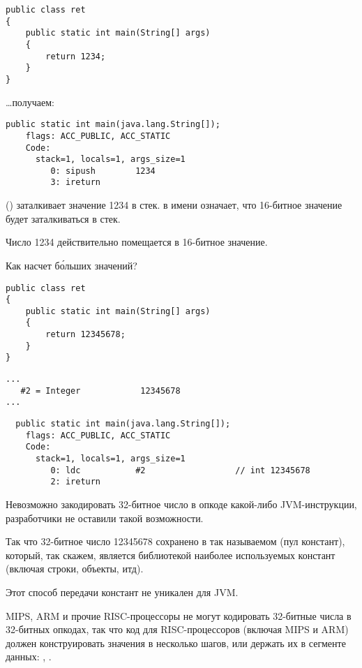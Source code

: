 \begin{lstlisting}
public class ret
{
	public static int main(String[] args)
	{
		return 1234;
	}
}
\end{lstlisting}

\dots получаем:

\begin{lstlisting}[caption=JDK 1.7 (excerpt)]
  public static int main(java.lang.String[]);
    flags: ACC_PUBLIC, ACC_STATIC
    Code:
      stack=1, locals=1, args_size=1
         0: sipush        1234
         3: ireturn       
\end{lstlisting}

 () заталкивает значение 1234 в стек.
 в имени означает, что 16-битное значение будет заталкиваться в стек. 

Число 1234 действительно помещается в 16-битное значение.

Как насчет б\'{о}льших значений?

\begin{lstlisting}
public class ret
{
	public static int main(String[] args) 
	{
		return 12345678;
	}
}
\end{lstlisting}

\begin{lstlisting}[caption=Constant pool]
...
   #2 = Integer            12345678
...
\end{lstlisting}

\begin{lstlisting}
  public static int main(java.lang.String[]);
    flags: ACC_PUBLIC, ACC_STATIC
    Code:
      stack=1, locals=1, args_size=1
         0: ldc           #2                  // int 12345678
         2: ireturn       
\end{lstlisting}

Невозможно закодировать 32-битное число в опкоде какой-либо JVM-инструкции, 
разработчики не оставили такой возможности.

Так что 32-битное число 12345678 сохранено в так называемом  (пул констант),
который, так скажем, является библиотекой наиболее используемых констант (включая строки, объекты,
итд).

Этот способ передачи констант не уникален для JVM.

MIPS, ARM и прочие RISC-процессоры не могут кодировать 32-битные числа в 32-битных опкодах,
так что код для RISC-процессоров (включая MIPS и ARM) должен конструировать значения 
в несколько шагов, или держать их в сегменте данных:
, .

